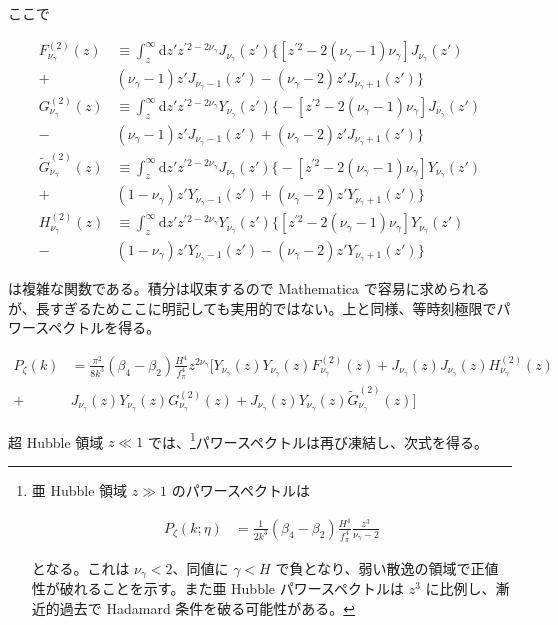 \documentclass[a4paper,11pt]{ltjsarticle}
\numberwithin{equation}{section}
\newcommand{\dd}{\mathrm{d}}
\begin{document}
ここで

\begin{align}
F^{(2)}_{\nu_\gamma}(z) &\equiv \int_{z}^{\infty} \dd z'       z^{\prime2 - 2{\nu_\gamma}} J_{\nu_\gamma}(z') \bigg\{\left[z^{\prime2}-2 (\nu_\gamma -1) \nu_\gamma \right] J_{\nu_\gamma }(z') \nonumber \\
        +&(\nu_\gamma -1) z' J_{\nu_\gamma -1}(z')-(\nu_\gamma -2) z' J_{\nu_\gamma +1}(z') \bigg\}\\
        G^{(2)}_{\nu_\gamma}(z) &\equiv \int_{z}^{\infty} \dd z' z^{\prime2 - 2{\nu_\gamma}} Y_{\nu_\gamma}(z') \bigg\{-\left[z^{\prime2}-2 (\nu_\gamma -1) \nu_\gamma \right] J_{\nu_\gamma }(z') \nonumber \\
        -&(\nu_\gamma -1) z' J_{\nu_\gamma -1}(z')+(\nu_\gamma -2) z' J_{\nu_\gamma +1}(z') \bigg\} \\
        \tilde{G}^{(2)}_{\nu_\gamma}(z) &\equiv \int_{z}^{\infty} \dd z' z^{\prime2 - 2{\nu_\gamma}} J_{\nu_\gamma}(z') \bigg\{ -\left[z^{\prime2}-2 (\nu_\gamma -1) \nu_\gamma \right] Y_{\nu_\gamma }(z')\nonumber \\
        +&(1-\nu_\gamma )z' Y_{\nu_\gamma -1}(z')+(\nu_\gamma -2) z' Y_{\nu_\gamma +1}(z') \bigg\} \\
        H^{(2)}_{\nu_\gamma}(z)&\equiv \int_{z}^{\infty} \dd z' z^{\prime2 - 2{\nu_\gamma}} Y_{\nu_\gamma}(z') \bigg\{ \left[z^{\prime2}-2 (\nu_\gamma-1) \nu_\gamma\right] Y_{\nu_\gamma}(z') \nonumber \\
        -&(1-\nu_\gamma) z'Y_{\nu_\gamma-1}(z')-(\nu_\gamma-2) z' Y_{\nu_\gamma+1}(z')\bigg\}
\end{align}

は複雑な関数である。積分は収束するので Mathematica で容易に求められるが、長すぎるためここに明記しても実用的ではない。上と同様、等時刻極限でパワースペクトルを得る。

\begin{align}
P_\zeta(k) &= \frac{\pi^2}{8 k^3} (\beta_4 - \beta_2 ) \frac{H^4}{f_\pi^4}z^{2\nu_\gamma} \bigg[Y_{\nu_\gamma}(z) Y_{\nu_\gamma}(z) F^{(2)}_{\nu_\gamma}(z) + J_{\nu_\gamma}(z) J_{\nu_\gamma}(z) H^{(2)}_{\nu_\gamma}(z) \nonumber \\
+& J_{\nu_\gamma}(z)Y_{\nu_\gamma}(z)G^{(2)}_{\nu_\gamma}(z) + J_{\nu_\gamma}(z)Y_{\nu_\gamma}(z)\tilde{G}^{(2)}_{\nu_\gamma}(z) \bigg]
\end{align}

超 Hubble 領域 $z\ll1$ では、\footnote{亜 Hubble 領域 $z\gg1$ のパワースペクトルは

\begin{align}\label{eq:subHPk2}
    P_\zeta(k;\eta) &=  \frac{1}{2k^3} (\beta_4- \beta_2)\frac{H^4}{f_\pi^4} \frac{z^3}{\nu_\gamma-2}
\end{align}

となる。これは $\nu_\gamma<2$、同値に $\gamma<H$ で負となり、弱い散逸の領域で正値性が破れることを示す。また亜 Hubble パワースペクトルは $z^3$ に比例し、漸近的過去で Hadamard 条件を破る可能性がある。}パワースペクトルは再び凍結し、次式を得る。
\end{document}
